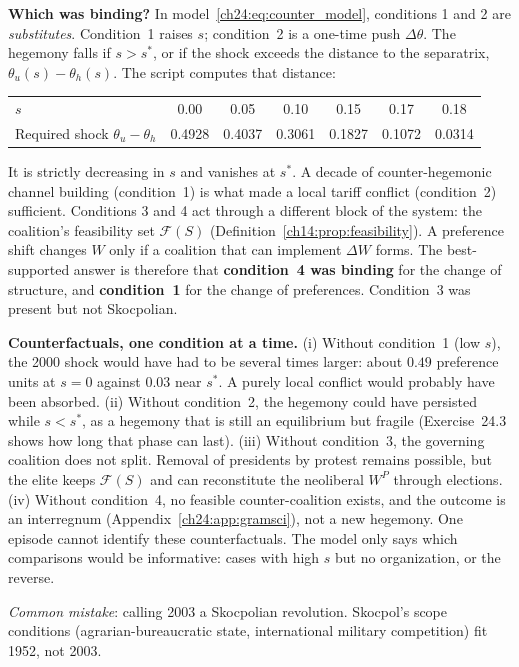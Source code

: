 \documentclass[../solutions_manual.tex]{subfiles}
\begin{document}
 \textbf{Which was binding?} In model~\eqref{ch24:eq:counter_model}, conditions 1 and 2 are \emph{substitutes}. Condition~1 raises $s$; condition~2 is a one-time push $\Delta\theta$. The hegemony falls if $s > s^*$, or if the shock exceeds the distance to the separatrix, $\theta_u(s) - \theta_h(s)$. The script computes that distance:
\begin{center}
\begin{tabular}{lcccccc}
\toprule
$s$ & 0.00 & 0.05 & 0.10 & 0.15 & 0.17 & 0.18 \\
Required shock $\theta_u - \theta_h$ & 0.4928 & 0.4037 & 0.3061 & 0.1827 & 0.1072 & 0.0314 \\
\bottomrule
\end{tabular}
\end{center}
It is strictly decreasing in $s$ and vanishes at $s^*$. A decade of counter-hegemonic channel building (condition~1) is what made a local tariff conflict (condition~2) sufficient. Conditions 3 and 4 act through a different block of the system: the coalition's feasibility set $\mathcal{F}(S)$ (Definition~\ref{ch14:prop:feasibility}). A preference shift changes $W$ only if a coalition that can implement $\Delta W$ forms. The best-supported answer is therefore that \textbf{condition~4 was binding} for the change of structure, and \textbf{condition~1} for the change of preferences. Condition~3 was present but not Skocpolian.

 \textbf{Counterfactuals, one condition at a time.} (i) Without condition~1 (low $s$), the 2000 shock would have had to be several times larger: about $0.49$ preference units at $s = 0$ against $0.03$ near $s^*$. A purely local conflict would probably have been absorbed. (ii) Without condition~2, the hegemony could have persisted while $s < s^*$, as a hegemony that is still an equilibrium but fragile (Exercise~24.3 shows how long that phase can last). (iii) Without condition~3, the governing coalition does not split. Removal of presidents by protest remains possible, but the elite keeps $\mathcal{F}(S)$ and can reconstitute the neoliberal $W^P$ through elections. (iv) Without condition~4, no feasible counter-coalition exists, and the outcome is an interregnum (Appendix~\ref{ch24:app:gramsci}), not a new hegemony. One episode cannot identify these counterfactuals. The model only says which comparisons would be informative: cases with high $s$ but no organization, or the reverse.

\emph{Common mistake}: calling 2003 a Skocpolian revolution. Skocpol's scope conditions (agrarian-bureaucratic state, international military competition) fit 1952, not 2003.
\end{document}
